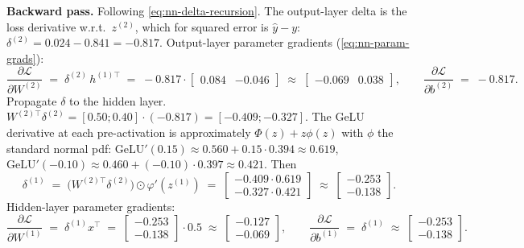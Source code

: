 \begin{workedexample}
\textbf{Backward pass.} Following \eqref{eq:nn-delta-recursion}.
The output-layer delta is the loss derivative w.r.t.\ $z^{(2)}$,
which for squared error is $\hat y - y$:
$\delta^{(2)} = 0.024 - 0.841 = -0.817$.
Output-layer parameter gradients (\eqref{eq:nn-param-grads}):
\[
  \frac{\partial \mathcal{L}}{\partial W^{(2)}}
  \;=\; \delta^{(2)}\, h^{(1)\top}
  \;=\; -0.817 \cdot \begin{bmatrix} 0.084 & -0.046 \end{bmatrix}
  \;\approx\; \begin{bmatrix} -0.069 & 0.038 \end{bmatrix},
  \qquad
  \frac{\partial \mathcal{L}}{\partial b^{(2)}}
  \;=\; -0.817.
\]
Propagate $\delta$ to the hidden layer.
$W^{(2)\top} \delta^{(2)} = [0.50; 0.40] \cdot (-0.817) = [-0.409; -0.327]$.
The GeLU derivative at each pre-activation is approximately
$\Phi(z) + z \phi(z)$ with $\phi$ the standard normal pdf:
$\mathrm{GeLU}'(0.15) \approx 0.560 + 0.15 \cdot 0.394 \approx 0.619$,
$\mathrm{GeLU}'(-0.10) \approx 0.460 + (-0.10) \cdot 0.397 \approx 0.421$.
Then
\[
  \delta^{(1)}
  \;=\; \bigl(W^{(2)\top} \delta^{(2)}\bigr) \odot \varphi'(z^{(1)})
  \;=\; \begin{bmatrix} -0.409 \cdot 0.619 \\ -0.327 \cdot 0.421 \end{bmatrix}
  \;\approx\; \begin{bmatrix} -0.253 \\ -0.138 \end{bmatrix}.
\]
Hidden-layer parameter gradients:
\[
  \frac{\partial \mathcal{L}}{\partial W^{(1)}}
  \;=\; \delta^{(1)} x^\top
  \;=\; \begin{bmatrix} -0.253 \\ -0.138 \end{bmatrix} \cdot 0.5
  \;\approx\; \begin{bmatrix} -0.127 \\ -0.069 \end{bmatrix},
  \qquad
  \frac{\partial \mathcal{L}}{\partial b^{(1)}}
  \;=\; \delta^{(1)}
  \;\approx\; \begin{bmatrix} -0.253 \\ -0.138 \end{bmatrix}.
\]


\end{workedexample}
